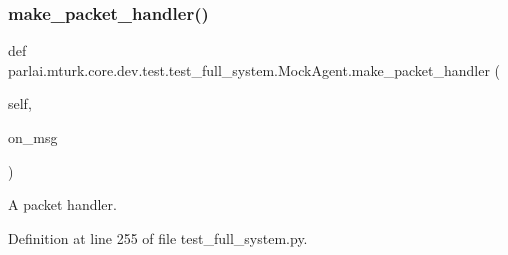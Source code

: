 \subsubsection{\texorpdfstring{make\+\_\+packet\+\_\+handler()}{make\_packet\_handler()}}
{\footnotesize\ttfamily def parlai.\+mturk.\+core.\+dev.\+test.\+test\+\_\+full\+\_\+system.\+Mock\+Agent.\+make\+\_\+packet\+\_\+handler (\begin{DoxyParamCaption}\item[{}]{self,  }\item[{}]{on\+\_\+msg }\end{DoxyParamCaption})}

\begin{DoxyVerb}A packet handler.
\end{DoxyVerb}
 

Definition at line 255 of file test\+\_\+full\+\_\+system.\+py.


